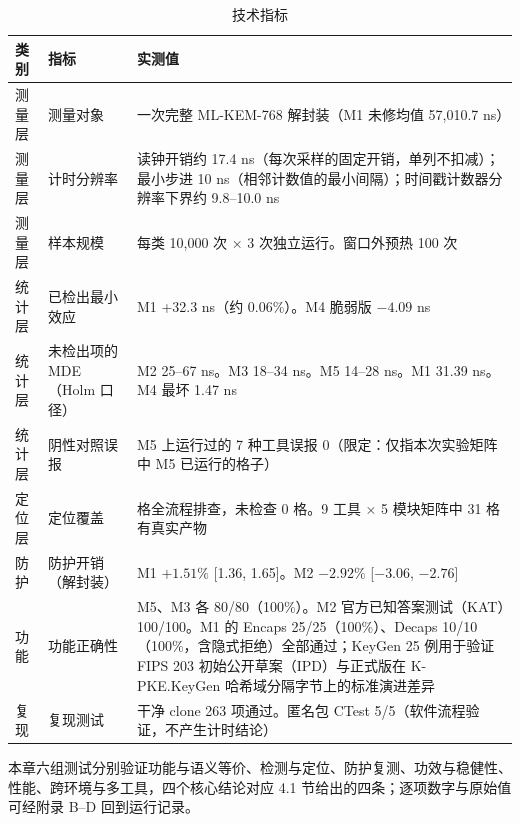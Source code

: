 \begin{table}[H]
\centering
\caption{技术指标}
\label{tab:metrics}
{\scriptsize
\begin{tabularx}{\textwidth}{|>{\raggedright\arraybackslash}p{1.6cm}|>{\raggedright\arraybackslash}p{3.0cm}|>{\raggedright\arraybackslash}X|}
\hline
类别 & 指标 & 实测值 \\
\hline
测量层 & 测量对象 & 一次完整 ML-KEM-768 解封装（M1 未修均值 57,010.7 ns） \\
\hline
测量层 & 计时分辨率 & 读钟开销约 17.4 ns（每次采样的固定开销，单列不扣减）；最小步进 10 ns（相邻计数值的最小间隔）；时间戳计数器分辨率下界约 9.8--10.0 ns \\
\hline
测量层 & 样本规模 & 每类 10,000 次 × 3 次独立运行。窗口外预热 100 次 \\
\hline
统计层 & 已检出最小效应 & M1 +32.3 ns（约 0.06\%）。M4 脆弱版 $-4.09$ ns \\
\hline
统计层 & 未检出项的 MDE（Holm 口径） & M2 25--67 ns。M3 18--34 ns。M5 14--28 ns。M1 31.39 ns。M4 最坏 1.47 ns \\
\hline
统计层 & 阴性对照误报 & M5 上运行过的 7 种工具误报 0（限定：仅指本次实验矩阵中 M5 已运行的格子） \\
\hline
定位层 & 定位覆盖 & 90 格全流程排查，未检查 0 格。9 工具 × 5 模块矩阵中 31 格有真实产物 \\
\hline
防护 & 防护开销（解封装） & M1 $+1.51\%$ [1.36, 1.65]。M2 $-2.92\%$ [$-3.06$, $-2.76$] \\
\hline
功能 & 功能正确性 & M5、M3 各 80/80（100\%）。M2 官方已知答案测试（KAT）100/100。M1 的 Encaps 25/25（100\%）、Decaps 10/10（100\%，含隐式拒绝）全部通过；KeyGen 25 例用于验证 FIPS 203 初始公开草案（IPD）与正式版在 K-PKE.KeyGen 哈希域分隔字节上的标准演进差异 \\
\hline
复现 & 复现测试 & 干净 clone 263 项通过。匿名包 CTest 5/5（软件流程验证，不产生计时结论） \\
\hline
\end{tabularx}
}
\end{table}

本章六组测试分别验证功能与语义等价、检测与定位、防护复测、功效与稳健性、性能、跨环境与多工具，四个核心结论对应 4.1 节给出的四条；逐项数字与原始值可经附录 B--D 回到运行记录。
